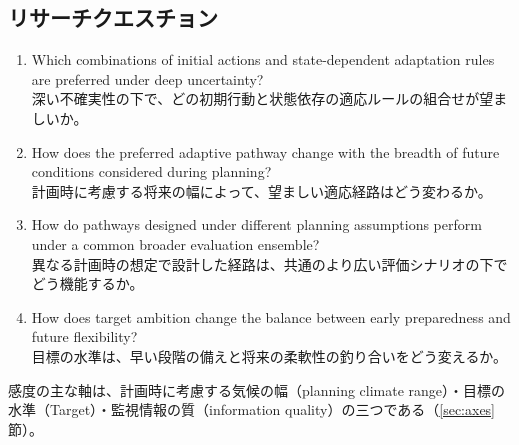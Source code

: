 \documentclass[a4paper,10pt]{ltjsarticle}
\begin{document}
\subsection{リサーチクエスチョン}
\begin{enumerate}
  \item[RQ1] Which combinations of initial actions and state-dependent adaptation rules are preferred under deep uncertainty?\\
    深い不確実性の下で、どの初期行動と状態依存の適応ルールの組合せが望ましいか。
  \item[RQ2] How does the preferred adaptive pathway change with the breadth of future conditions considered during planning?\\
    計画時に考慮する将来の幅によって、望ましい適応経路はどう変わるか。
  \item[RQ3] How do pathways designed under different planning assumptions perform under a common broader evaluation ensemble?\\
    異なる計画時の想定で設計した経路は、共通のより広い評価シナリオの下でどう機能するか。
  \item[RQ4] How does target ambition change the balance between early preparedness and future flexibility?\\
    目標の水準は、早い段階の備えと将来の柔軟性の釣り合いをどう変えるか。
\end{enumerate}
感度の主な軸は、計画時に考慮する気候の幅（planning climate range）・目標の水準（Target）・監視情報の質（information quality）の三つである（\ref{sec:axes}節）。
\end{document}

